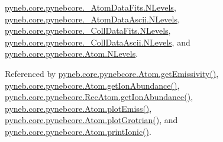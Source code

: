 \hyperlink{pynebcore_8py_source_l00098}{pyneb.\-core.\-pynebcore.\-\_\-\-Atom\-Data\-Fits.\-N\-Levels}, \hyperlink{pynebcore_8py_source_l00319}{pyneb.\-core.\-pynebcore.\-\_\-\-Atom\-Data\-Ascii.\-N\-Levels}, \hyperlink{pynebcore_8py_source_l00586}{pyneb.\-core.\-pynebcore.\-\_\-\-Coll\-Data\-Fits.\-N\-Levels}, \hyperlink{pynebcore_8py_source_l00933}{pyneb.\-core.\-pynebcore.\-\_\-\-Coll\-Data\-Ascii.\-N\-Levels}, and \hyperlink{pynebcore_8py_source_l01231}{pyneb.\-core.\-pynebcore.\-Atom.\-N\-Levels}.



Referenced by \hyperlink{pynebcore_8py_source_l01782}{pyneb.\-core.\-pynebcore.\-Atom.\-get\-Emissivity()}, \hyperlink{pynebcore_8py_source_l02176}{pyneb.\-core.\-pynebcore.\-Atom.\-get\-Ion\-Abundance()}, \hyperlink{pynebcore_8py_source_l03083}{pyneb.\-core.\-pynebcore.\-Rec\-Atom.\-get\-Ion\-Abundance()}, \hyperlink{pynebcore_8py_source_l02384}{pyneb.\-core.\-pynebcore.\-Atom.\-plot\-Emiss()}, \hyperlink{pynebcore_8py_source_l02443}{pyneb.\-core.\-pynebcore.\-Atom.\-plot\-Grotrian()}, and \hyperlink{pynebcore_8py_source_l02233}{pyneb.\-core.\-pynebcore.\-Atom.\-print\-Ionic()}.


